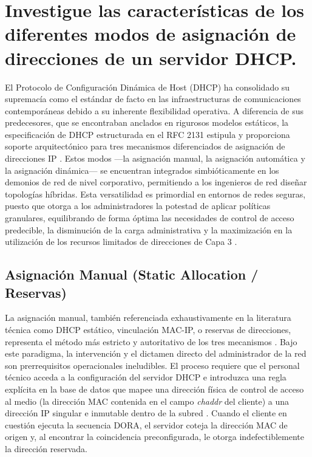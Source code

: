 \documentclass[a4paper,12pt]{article}
\begin{document}
\newpage

\section{Investigue las características de los diferentes modos de asignación de direcciones de un servidor DHCP.}

El Protocolo de Configuración Dinámica de Host (DHCP) ha consolidado su supremacía como el estándar de facto en las infraestructuras de comunicaciones contemporáneas debido a su inherente flexibilidad operativa. A diferencia de sus predecesores, que se encontraban anclados en rigurosos modelos estáticos, la especificación de DHCP estructurada en el RFC 2131 estipula y proporciona soporte arquitectónico para tres mecanismos diferenciados de asignación de direcciones IP \cite{rfc2131, tcpipguide_dhcp, cisco_dhcp}. Estos modos —la asignación manual, la asignación automática y la asignación dinámica— se encuentran integrados simbióticamente en los demonios de red de nivel corporativo, permitiendo a los ingenieros de red diseñar topologías híbridas. Esta versatilidad es primordial en entornos de redes seguras, puesto que otorga a los administradores la potestad de aplicar políticas granulares, equilibrando de forma óptima las necesidades de control de acceso predecible, la disminución de la carga administrativa y la maximización en la utilización de los recursos limitados de direcciones de Capa 3 \cite{cisco_dhcp}.

\subsection*{Asignación Manual (Static Allocation / Reservas)}
La asignación manual, también referenciada exhaustivamente en la literatura técnica como DHCP estático, vinculación MAC-IP, o reservas de direcciones, representa el método más estricto y autoritativo de los tres mecanismos \cite{tcpipguide_dhcp, cisco_dhcp, paloalto_dhcp}. Bajo este paradigma, la intervención y el dictamen directo del administrador de la red son prerrequisitos operacionales ineludibles. El proceso requiere que el personal técnico acceda a la configuración del servidor DHCP e introduzca una regla explícita en la base de datos que mapee una dirección física de control de acceso al medio (la dirección MAC contenida en el campo \textit{chaddr} del cliente) a una dirección IP singular e inmutable dentro de la subred \cite{rfc2131, paloalto_dhcp}. Cuando el cliente en cuestión ejecuta la secuencia DORA, el servidor coteja la dirección MAC de origen y, al encontrar la coincidencia preconfigurada, le otorga indefectiblemente la dirección reservada.
\end{document}
